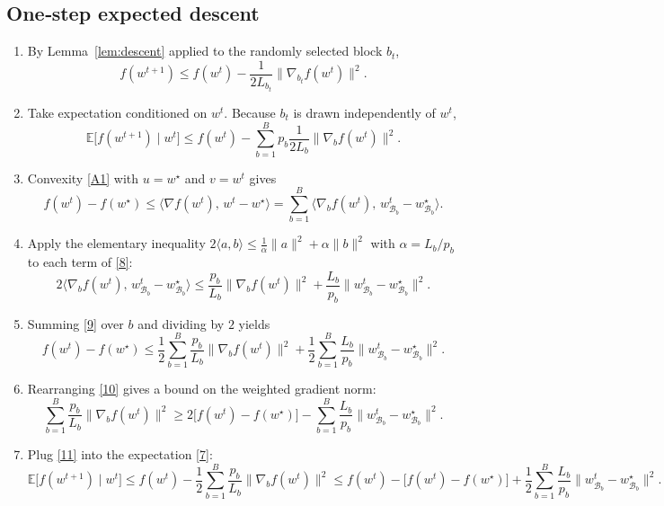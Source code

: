 \documentclass[11pt]{article}
\newcommand{\E}{\mathbb{E}}
\begin{document}
\subsection*{One‑step expected descent}
\begin{enumerate}[label=[Step \arabic*],leftmargin=*]
\item By Lemma~\ref{lem:descent} applied to the randomly selected block $b_{t}$,
\[
f(w^{t+1})\le f(w^{t})-\frac{1}{2L_{b_{t}}}
\bigl\|\nabla_{b_{t}}f(w^{t})\bigr\|^{2}.
\tag{6}
\]

\item Take expectation conditioned on $w^{t}$.
Because $b_{t}$ is drawn independently of $w^{t}$,
\[
\E\!\bigl[f(w^{t+1})\mid w^{t}\bigr]
\le f(w^{t})-
\sum_{b=1}^{B}p_{b}\frac{1}{2L_{b}}
\bigl\|\nabla_{b}f(w^{t})\bigr\|^{2}.
\tag{7}
\]

\item Convexity \eqref{A1} with $u=w^{\star}$ and $v=w^{t}$ gives
\[
f(w^{t})-f(w^{\star})\le
\langle \nabla f(w^{t}),\,w^{t}-w^{\star}\rangle
=\sum_{b=1}^{B}\langle \nabla_{b}f(w^{t}),\,
w^{t}_{\mathcal{B}_{b}}-w^{\star}_{\mathcal{B}_{b}}\rangle .
\tag{8}
\]

\item Apply the elementary inequality
$2\langle a,b\rangle\le \frac{1}{\alpha}\|a\|^{2}+\alpha\|b\|^{2}$
with $\alpha=L_{b}/p_{b}$ to each term of \eqref{8}:
\[
2\langle \nabla_{b}f(w^{t}),\,w^{t}_{\mathcal{B}_{b}}-w^{\star}_{\mathcal{B}_{b}}\rangle
\le
\frac{p_{b}}{L_{b}}\|\nabla_{b}f(w^{t})\|^{2}
+\frac{L_{b}}{p_{b}}\|w^{t}_{\mathcal{B}_{b}}-w^{\star}_{\mathcal{B}_{b}}\|^{2}.
\tag{9}
\]

\item Summing \eqref{9} over $b$ and dividing by $2$ yields
\[
f(w^{t})-f(w^{\star})\le
\frac12\sum_{b=1}^{B}\frac{p_{b}}{L_{b}}\|\nabla_{b}f(w^{t})\|^{2}
+\frac12\sum_{b=1}^{B}\frac{L_{b}}{p_{b}}
\|w^{t}_{\mathcal{B}_{b}}-w^{\star}_{\mathcal{B}_{b}}\|^{2}.
\tag{10}
\]

\item Rearranging \eqref{10} gives a bound on the weighted gradient norm:
\[
\sum_{b=1}^{B}\frac{p_{b}}{L_{b}}\|\nabla_{b}f(w^{t})\|^{2}
\ge
2\bigl[f(w^{t})-f(w^{\star})\bigr]
-
\sum_{b=1}^{B}\frac{L_{b}}{p_{b}}
\|w^{t}_{\mathcal{B}_{b}}-w^{\star}_{\mathcal{B}_{b}}\|^{2}.
\tag{11}
\]

\item Plug \eqref{11} into the expectation \eqref{7}:
\[
\E\!\bigl[f(w^{t+1})\mid w^{t}\bigr]
\le f(w^{t})-
\frac12\sum_{b=1}^{B}\frac{p_{b}}{L_{b}}\|\nabla_{b}f(w^{t})\|^{2}
\le
f(w^{t})-
\bigl[f(w^{t})-f(w^{\star})\bigr]
+\frac12\sum_{b=1}^{B}\frac{L_{b}}{p_{b}}
\|w^{t}_{\mathcal{B}_{b}}-w^{\star}_{\mathcal{B}_{b}}\|^{2}.
\tag{12}
\]


\end{enumerate}
\end{document}
